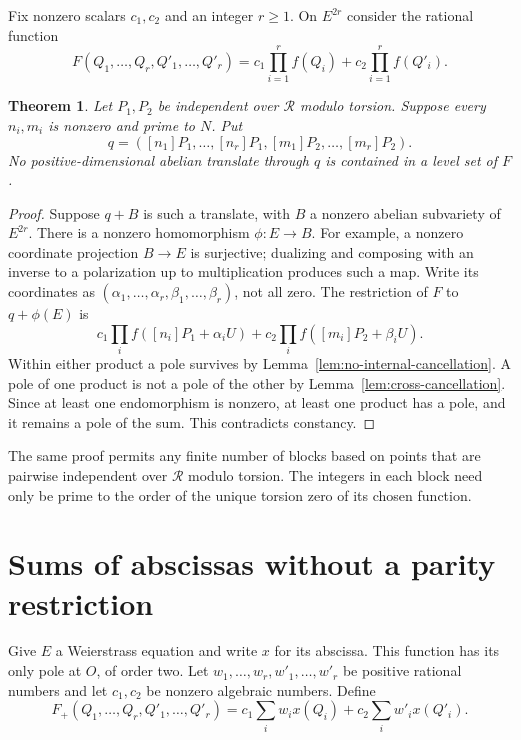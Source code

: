 \documentclass[11pt,a4paper]{article}
\newtheorem{theorem}{Theorem}
\begin{document}
Fix nonzero scalars $c_1,c_2$ and an integer $r\ge1$. On
$E^{2r}$ consider the rational function
\[
 F(Q_1,\ldots,Q_r,Q'_1,\ldots,Q'_r)
 =c_1\prod_{i=1}^r f(Q_i)+c_2\prod_{i=1}^r f(Q'_i).
\]

\begin{theorem}\label{thm:no-translate}
Let $P_1,P_2$ be independent over $\mathcal R$ modulo torsion.
Suppose every $n_i,m_i$ is nonzero and prime to $N$. Put
\[
 q=([n_1]P_1,\ldots,[n_r]P_1,
       [m_1]P_2,\ldots,[m_r]P_2).
\]
No positive-dimensional abelian translate through $q$ is
contained in a level set of $F$.
\end{theorem}
\begin{proof}
Suppose $q+B$ is such a translate, with $B$ a nonzero abelian
subvariety of $E^{2r}$. There is a nonzero homomorphism
$\phi:E\to B$. For example, a nonzero coordinate projection
$B\to E$ is surjective; dualizing and composing with an inverse
to a polarization up to multiplication produces such a map.
Write its coordinates as
$(\alpha_1,\ldots,\alpha_r,\beta_1,\ldots,\beta_r)$,
not all zero. The restriction of $F$ to $q+\phi(E)$ is
\[
 c_1\prod_i f([n_i]P_1+\alpha_iU)
 +c_2\prod_i f([m_i]P_2+\beta_iU).
\]
Within either product a pole survives by
Lemma~\ref{lem:no-internal-cancellation}. A pole of one product
is not a pole of the other by
Lemma~\ref{lem:cross-cancellation}. Since at least one
endomorphism is nonzero, at least one product has a pole, and
it remains a pole of the sum. This contradicts constancy.
\end{proof}

The same proof permits any finite number of blocks based on
points that are pairwise independent over $\mathcal R$ modulo
torsion. The integers in each block need only be prime to the
order of the unique torsion zero of its chosen function.

\section{Sums of abscissas without a parity restriction}

Give $E$ a Weierstrass equation and write $x$ for its abscissa.
This function has its only pole at $O$, of order two. Let
$w_1,\ldots,w_r,w'_1,\ldots,w'_r$ be positive rational numbers
and let $c_1,c_2$ be nonzero algebraic numbers. Define
\[
 F_+(Q_1,\ldots,Q_r,Q'_1,\ldots,Q'_r)
   =c_1\sum_i w_i x(Q_i)+c_2\sum_i w'_i x(Q'_i).
\]
\end{document}
